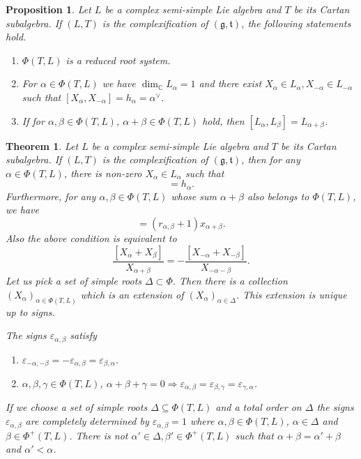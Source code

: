 \documentclass{article}
\newtheorem{theorem}{Theorem}[section]
\newtheorem{proposition}{Proposition}[section]
\numberwithin{equation}{section}
\begin{document}
\begin{proposition}
Let $L$ be a complex semi-simple Lie algebra and $T$ be its Cartan subalgebra. If $(L,T)$ is the complexification of $(\mathfrak{g},\mathfrak{t})$, the following statements hold.
\begin{enumerate}
\item $\Phi(T,L)$ is a reduced root system.
\item For $\alpha\in\Phi(T,L)$ we have $\dim_\mathbb{C}L_\alpha=1$ and there exist $X_\alpha\in L_\alpha,X_{-\alpha}\in L_{-\alpha}$ such that $[X_\alpha,X_{-\alpha}]=h_\alpha=\alpha^\lor$.
\item If for $\alpha,\beta\in\Phi(T,L)$, $\alpha+\beta\in\Phi(T,L)$ hold, then $[L_\alpha,L_\beta] = L_{\alpha+\beta}$.
\end{enumerate}
\end{proposition}

\begin{theorem}
Let $L$ be a complex semi-simple Lie algebra and $T$ be its Cartan subalgebra. If $(L,T)$ is the complexification of $(\mathfrak{g},\mathfrak{t})$, then for any $\alpha\in\Phi(T,L)$, there is non-zero $X_\alpha\in L_\alpha$ such that 
\begin{equation*}
[X_\alpha,X_{-\alpha}] = h_\alpha.
\end{equation*}
Furthermore, for any $\alpha,\beta\in \Phi(T,L)$ whose sum $\alpha+\beta$ also belongs to $\Phi(T,L)$, we have
\begin{equation*}
[X_\alpha,X_\beta] = (r_{\alpha,\beta}+1)x_{\alpha+\beta}.
\end{equation*}
Also the above condition is equivalent to 
\begin{equation*}
{\frac {[X_\alpha+X_\beta]} {X_{\alpha+\beta}}}=-{\frac {[X_{-\alpha}+X_{-\beta}]} {X_{-\alpha-\beta}}}.
\end{equation*}
Let us pick a set of simple roots $\Delta\subset\Phi$. Then there is a collection $(X_\alpha)_{\alpha\in\Phi(T,L)}$ which is an extension of $(X_\alpha)_{\alpha\in\Delta}$. This extension is unique up to signs.\\
\par The signs $\varepsilon_{\alpha,\beta}$ satisfy
\begin{enumerate}
\item $\varepsilon_{-\alpha,-\beta} = -\varepsilon_{\alpha,\beta}=\varepsilon_{\beta,\alpha}$.
\item $\alpha,\beta,\gamma\in \Phi(T,L)$, $\alpha+\beta+\gamma=0\Rightarrow \varepsilon_{\alpha,\beta}=\varepsilon_{\beta,\gamma}=\varepsilon_{\gamma,\alpha}$.
\end{enumerate}

If we choose a set of simple roots $\Delta\subseteq\Phi(T,L)$ and a total order on $\Delta$ the signs $\varepsilon_{\alpha,\beta}$ are completely determined by $\varepsilon_{\alpha,\beta}=1$ where $\alpha,\beta\in\Phi(T,L)$, $\alpha\in\Delta$ and $\beta\in \Phi^+(T,L)$. There is not $\alpha'\in\Delta,\beta'\in\Phi^+(T,L)$ such that $\alpha+\beta=\alpha'+\beta$ and $\alpha'<\alpha$.
\end{theorem}
\end{document}
